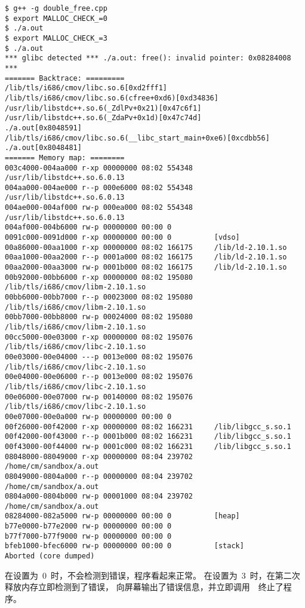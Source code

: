 \begin{lstlisting}
$ g++ -g double_free.cpp
$ export MALLOC_CHECK_=0
$ ./a.out
$ export MALLOC_CHECK_=3
$ ./a.out
*** glibc detected *** ./a.out: free(): invalid pointer: 0x08284008 ***
======= Backtrace: =========
/lib/tls/i686/cmov/libc.so.6[0xd2fff1]
/lib/tls/i686/cmov/libc.so.6(cfree+0xd6)[0xd34836]
/usr/lib/libstdc++.so.6(_ZdlPv+0x21)[0x47c6f1]
/usr/lib/libstdc++.so.6(_ZdaPv+0x1d)[0x47c74d]
./a.out[0x8048591]
/lib/tls/i686/cmov/libc.so.6(__libc_start_main+0xe6)[0xcdbb56]
./a.out[0x8048481]
======= Memory map: ========
003c4000-004aa000 r-xp 00000000 08:02 554348     /usr/lib/libstdc++.so.6.0.13
004aa000-004ae000 r--p 000e6000 08:02 554348     /usr/lib/libstdc++.so.6.0.13
004ae000-004af000 rw-p 000ea000 08:02 554348     /usr/lib/libstdc++.so.6.0.13
004af000-004b6000 rw-p 00000000 00:00 0
0091c000-0091d000 r-xp 00000000 00:00 0          [vdso]
00a86000-00aa1000 r-xp 00000000 08:02 166175     /lib/ld-2.10.1.so
00aa1000-00aa2000 r--p 0001a000 08:02 166175     /lib/ld-2.10.1.so
00aa2000-00aa3000 rw-p 0001b000 08:02 166175     /lib/ld-2.10.1.so
00b92000-00bb6000 r-xp 00000000 08:02 195080     /lib/tls/i686/cmov/libm-2.10.1.so
00bb6000-00bb7000 r--p 00023000 08:02 195080     /lib/tls/i686/cmov/libm-2.10.1.so
00bb7000-00bb8000 rw-p 00024000 08:02 195080     /lib/tls/i686/cmov/libm-2.10.1.so
00cc5000-00e03000 r-xp 00000000 08:02 195076     /lib/tls/i686/cmov/libc-2.10.1.so
00e03000-00e04000 ---p 0013e000 08:02 195076     /lib/tls/i686/cmov/libc-2.10.1.so
00e04000-00e06000 r--p 0013e000 08:02 195076     /lib/tls/i686/cmov/libc-2.10.1.so
00e06000-00e07000 rw-p 00140000 08:02 195076     /lib/tls/i686/cmov/libc-2.10.1.so
00e07000-00e0a000 rw-p 00000000 00:00 0
00f26000-00f42000 r-xp 00000000 08:02 166231     /lib/libgcc_s.so.1
00f42000-00f43000 r--p 0001b000 08:02 166231     /lib/libgcc_s.so.1
00f43000-00f44000 rw-p 0001c000 08:02 166231     /lib/libgcc_s.so.1
08048000-08049000 r-xp 00000000 08:04 239702     /home/cm/sandbox/a.out
08049000-0804a000 r--p 00000000 08:04 239702     /home/cm/sandbox/a.out
0804a000-0804b000 rw-p 00001000 08:04 239702     /home/cm/sandbox/a.out
08284000-082a5000 rw-p 00000000 00:00 0          [heap]
b77e0000-b77e2000 rw-p 00000000 00:00 0
b77f7000-b77f9000 rw-p 00000000 00:00 0
bfeb1000-bfec6000 rw-p 00000000 00:00 0          [stack]
Aborted (core dumped)
\end{lstlisting}

在设置为~0~时，不会检测到错误，程序看起来正常。
在设置为~3~时，在第二次释放内存立即检测到了错误，
向屏幕输出了错误信息，并立即调用~~终止了程序。


